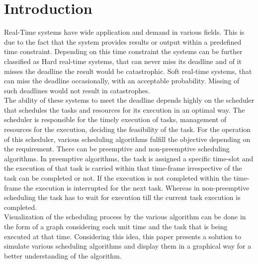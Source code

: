 \documentclass[12pt, conference]{IEEEtran}
\begin{document}
\section{Introduction}
Real-Time systems have wide application and demand in various fields. This is due to the fact that the system provides results or output within a predefined time constraint. Depending on this time constraint the systems can be further classified as Hard real-time systems, that can never miss its deadline and of it misses the deadline the result would be catastrophic. Soft real-time systems, that can miss the deadline occasionally, with an acceptable probability.  Missing of such deadlines would not result in catastrophes.\\
The ability of these systems to meet the deadline depends highly on the scheduler that schedules the tasks and resources for its execution in an optimal way. The scheduler is responsible for the timely execution of tasks, management of resources for the execution, deciding the feasibility of the task. For the operation of this scheduler, various scheduling algorithms fulfill the objective depending on the requirement. 
There can be preemptive and non-preemptive scheduling algorithms. In preemptive algorithms, the task is assigned a specific time-slot and the execution of that task is carried within that time-frame irrespective of the task can be completed or not. If the execution is not completed within the time-frame the execution is interrupted for the next task. Whereas in non-preemptive scheduling the task has to wait for execution till the current task execution is completed.\\
Visualization of the scheduling process by the various algorithm can be done in the form of a graph considering each unit time and the task that is being executed at that time. Considering this idea, this paper presents a solution to simulate various scheduling algorithms and display them in a graphical way for a better understanding of the algorithm.
\end{document}
